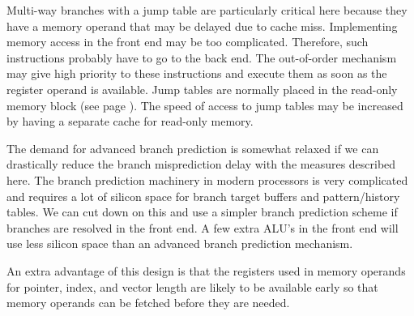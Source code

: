 \documentclass[forwardcom.tex]{subfiles}
\begin{document}
Multi-way branches with a jump table are particularly critical here because they have a memory operand that may be delayed due to cache miss. Implementing memory access in the front end may be too complicated. Therefore, such instructions probably have to go to the back end. The out-of-order mechanism may give high priority to these instructions and execute them as soon as the register operand is available. Jump tables are normally placed in the read-only memory block (see page \pageref{memoryModel}). The speed of access to jump tables may be increased by having a separate cache for read-only memory.
\vspace{2mm}

The demand for advanced branch prediction is somewhat relaxed if we can drastically reduce the branch misprediction delay with the measures described here. The branch prediction machinery in modern processors is very complicated and requires a lot of silicon space for branch target buffers and pattern/history tables. We can cut down on this and use a simpler branch prediction scheme if branches are resolved in the front end. A few extra ALU's in the front end will use less silicon space than an advanced branch prediction mechanism. 
\vspace{2mm}

An extra advantage of this design is that the registers used in memory operands for pointer, index, and vector length are likely to be available early so that memory operands can be fetched before they are needed.
\vspace{2mm}
\end{document}
